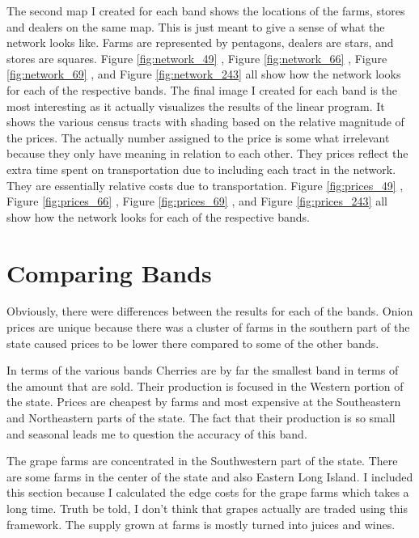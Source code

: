 \documentclass{report}
\begin{document}
The second map I created for each band shows the locations of the farms, stores and dealers on the same map. This is just meant to give a sense of what the network looks like. Farms are represented by pentagons, dealers are stars, and stores are squares. Figure \ref{fig:network_49} , Figure \ref{fig:network_66} , Figure \ref{fig:network_69} , and Figure \ref{fig:network_243} all show how the network looks for each of the respective bands. The final image I created for each band is the most interesting as it actually visualizes the results of the linear program. It shows the various census tracts with shading based on the relative magnitude of the prices. The actually number assigned to the price is some what irrelevant because they only have meaning in relation to each other. They prices reflect the extra time spent on transportation due to including each tract in the network. They are essentially relative costs due to transportation. Figure \ref{fig:prices_49} , Figure \ref{fig:prices_66} , Figure \ref{fig:prices_69} , and Figure \ref{fig:prices_243} all show how the network looks for each of the respective bands.

\section{Comparing Bands}

Obviously, there were differences between the results for each of the bands. Onion prices are unique because there was a cluster of farms in the southern part of the state caused prices to be lower there compared to some of the other bands.


In terms of the various bands Cherries are by far the smallest band in terms of the amount that are sold. Their production is focused in the Western portion of the state. Prices are cheapest by farms and most expensive at the Southeastern and Northeastern parts of the state. The fact that their production is so small and seasonal leads me to question the accuracy of this band. 

The grape farms are concentrated in the Southwestern part of the state. There are some farms in the center of the state and also Eastern Long Island. I included this section because I calculated the edge costs for the grape farms which takes a long time. Truth be told, I don't think that grapes actually are traded using this framework. The supply grown at farms is mostly turned into juices and wines.
\end{document}
